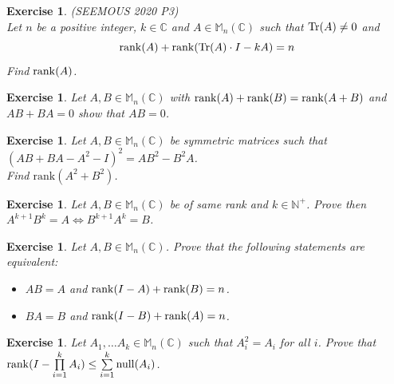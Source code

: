 \documentclass[12pt]{article}
\newcommand{\Rank}{\mathrm{rank}}
\newcommand{\Null}{\mathrm{null}}
\theoremstyle{definition}
\theoremstyle{remark}
\theoremstyle{plain}
\newtheorem{ex}[subsubsection]{Exercise}
\begin{document}
\begin{ex}\textup{(SEEMOUS 2020 P3)}\\
	Let $n$ be a positive integer, $ k\in \mathbb{C}$ and $A\in \mathbb{M}_n(\mathbb{C})$ such that $ \Tr(A) \neq 0 $ and $$\rank(A)+\rank(\Tr(A)\cdot I-kA)=n$$
	Find $\rank(A)$.
\end{ex}
\begin{ex}
    Let $A,B\in \mathbb{M}_n(\mathbb{C})$ with $\rank(A)+\rank(B)=\rank(A+B)$ and $AB+BA=0$ show that $AB=0$.
\end{ex}
\begin{ex}
    Let $A,B\in \mathbb{M}_n(\mathbb{C})$ be symmetric matrices such that $(AB+BA-A^2-I)^2=AB^2-B^2A$.\\
    Find $\Rank(A^2+B^2)$.
\end{ex}
\begin{ex}
    Let $A,B\in \mathbb{M}_n(\mathbb{C})$ be of same rank and $k\in \mathbb{N}^+$. Prove then $A^{k+1}B^k=A \iff B^{k+1}A^k=B$.
\end{ex}
\begin{ex}
    Let $A,B\in \mathbb{M}_n(\mathbb{C})$. Prove that the following statements are
equivalent:
\begin{itemize}
    \item $AB=A$ and $\rank(I-A)+\rank(B)=n$.
    \item $BA=B$ and $\rank(I-B)+\rank(A)=n$.
\end{itemize}
\end{ex}
\begin{ex}
    Let $A_1,\ldots A_k\in \mathbb{M}_n(\mathbb{C})$ such that $A_i^2=A_i$ for all $i$. Prove that $\rank(I-
    \prod\limits_{i=1}^{k} A_i)\leq \sum\limits_{i=1}^k\Null(A_i)$. 
\end{ex}
\end{document}
